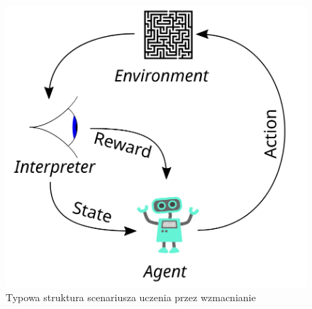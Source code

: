 \documentclass[a4paper, 12pt]{article}
\begin{document}
    \begin{figure}[H]
        \centering
        \includegraphics[width=\textwidth]{pictures/Reinforcement_learning_diagram.png}
        \caption{Typowa struktura scenariusza uczenia przez wzmacnianie \cite{wikipedia_reinforcement_learning}}
    \end{figure}
\end{document}

